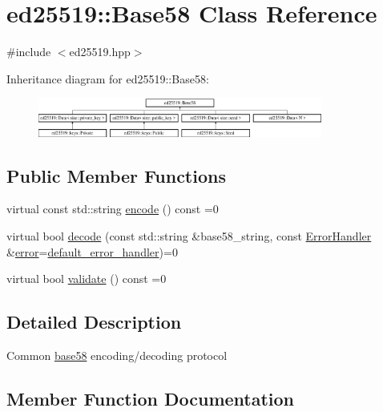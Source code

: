 \hypertarget{classed25519_1_1_base58}{}\section{ed25519\+:\+:Base58 Class Reference}
\label{classed25519_1_1_base58}


{\ttfamily \#include $<$ed25519.\+hpp$>$}

Inheritance diagram for ed25519\+:\+:Base58\+:\begin{figure}[H]
\begin{center}
\leavevmode
\includegraphics[height=1.278539cm]{classed25519_1_1_base58}
\end{center}
\end{figure}
\subsection*{Public Member Functions}
\begin{DoxyCompactItemize}
\item 
virtual const std\+::string \mbox{\hyperlink{classed25519_1_1_base58_a1b52a018a5215e2dcf2aa388b0fe06bf}{encode}} () const =0
\item 
virtual bool \mbox{\hyperlink{classed25519_1_1_base58_a3cb74be32923dcfb03a24b65015bee84}{decode}} (const std\+::string \&base58\+\_\+string, const \mbox{\hyperlink{namespaceed25519_a6ba572942b3c18591fc869d52a6b16e6}{Error\+Handler}} \&\mbox{\hyperlink{namespaceed25519_ac93d0b5156eaca22197055e902920bc4}{error}}=\mbox{\hyperlink{namespaceed25519_a7c7bb6ed17541162959c33ed3e3b15fb}{default\+\_\+error\+\_\+handler}})=0
\item 
virtual bool \mbox{\hyperlink{classed25519_1_1_base58_addfdb1d6d0f7e7f0cd0cf5dd2ee193bb}{validate}} () const =0
\end{DoxyCompactItemize}


\subsection{Detailed Description}
Common \mbox{\hyperlink{namespaceed25519_1_1base58}{base58}} encoding/decoding protocol 

\subsection{Member Function Documentation}
\mbox{\label{classed25519_1_1_base58_a3cb74be32923dcfb03a24b65015bee84}} 
